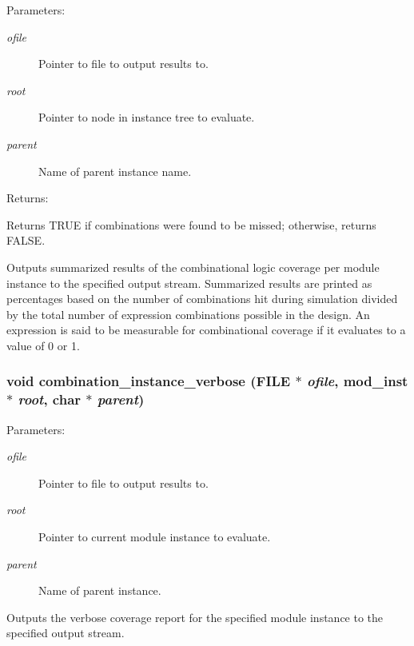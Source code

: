 \begin{Desc}
\item[Parameters: ]\par
\begin{description}
\item[{\em 
ofile}]Pointer to file to output results to. \item[{\em 
root}]Pointer to node in instance tree to evaluate. \item[{\em 
parent}]Name of parent instance name.\end{description}
\end{Desc}
\begin{Desc}
\item[Returns: ]\par
Returns TRUE if combinations were found to be missed; otherwise, returns FALSE.\end{Desc}
Outputs summarized results of the combinational logic coverage per module instance to the specified output stream. Summarized results are printed  as percentages based on the number of combinations hit during simulation  divided by the total number of expression combinations possible in the  design. An expression is said to be measurable for combinational coverage  if it evaluates to a value of 0 or 1. 
\subsubsection{\setlength{\rightskip}{0pt plus 5cm}void combination\_\-instance\_\-verbose (FILE $\ast$ {\em ofile}, {\bf mod\_\-inst} $\ast$ {\em root}, char $\ast$ {\em parent})}\label{comb_8c_a19}


\begin{Desc}
\item[Parameters: ]\par
\begin{description}
\item[{\em 
ofile}]Pointer to file to output results to. \item[{\em 
root}]Pointer to current module instance to evaluate. \item[{\em 
parent}]Name of parent instance.\end{description}
\end{Desc}
Outputs the verbose coverage report for the specified module instance to the specified output stream. 
